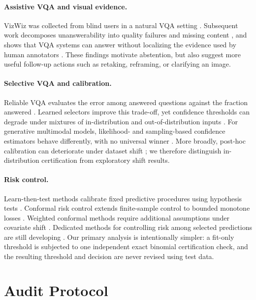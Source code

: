 \documentclass[11pt]{article}
\begin{document}
\paragraph{Assistive VQA and visual evidence.}
VizWiz was collected from blind users in a natural VQA setting
\citep{Gurari_2018_CVPR}.  Subsequent work decomposes unanswerability into quality
failures and missing content \citep{Chiu_2020_CVPR}, and shows that VQA systems can
answer without localizing the evidence used by human annotators
\citep{Chen_2022_CVPR}.  These findings motivate abstention, but also suggest more
useful follow-up actions such as retaking, reframing, or clarifying an image.

\paragraph{Selective VQA and calibration.}
Reliable VQA evaluates the error among answered questions against the fraction
answered \citep{whitehead2022reliablevqa}.  Learned selectors improve this
trade-off, yet confidence thresholds can degrade under mixtures of
in-distribution and out-of-distribution inputs \citep{Dancette_2023_CVPR}.
For generative multimodal models, likelihood- and sampling-based confidence
estimators behave differently, with no universal winner
\citep{eisenschlos-etal-2024-selectively}.  More broadly, post-hoc calibration can
deteriorate under dataset shift \citep{ovadia2019can}; we therefore distinguish
in-distribution certification from exploratory shift results.

\paragraph{Risk control.}
Learn-then-test methods calibrate fixed predictive procedures using hypothesis
tests \citep{angelopoulos2021learntest}.  Conformal risk control extends
finite-sample control to bounded monotone losses
\citep{angelopoulos2024conformal}.  Weighted conformal methods require additional
assumptions under covariate shift \citep{tibshirani2019conformal}.  Dedicated
methods for controlling risk among selected predictions are still developing
\citep{bai2026conformal}.  Our primary analysis is intentionally simpler: a
fit-only threshold is subjected to one independent exact binomial certification
check, and the resulting threshold and decision are never revised using test data.

\section{Audit Protocol}
\label{sec:protocol}
\end{document}
